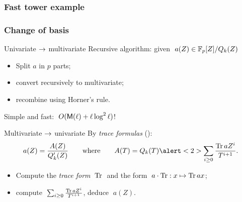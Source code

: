 \documentclass[10pt,usepdftitle=false]{beamer}
\begin{document}

\begin{frame}
  \frametitle{Fast tower example}
  
\end{frame}


\begin{frame}
  \frametitle{Change of basis}

  \begin{block}{Univariate $\rightarrow$ multivariate}
    Recursive algorithm: given $\;a(Z)\in\mathbb{F}_p[Z]/Q_k(Z)$
    \begin{itemize}
    \item Split $a$ in $p$ parts;
    \item convert recursively to multivariate;
    \item recombine using Horner's rule.
    \end{itemize}
    Simple and fast: \emph{$\;O(\mathsf{M}(\ell) + \ell\log^2\ell)$}!
  \end{block}

  \begin{block}{Multivariate $\rightarrow$ univariate}
    By \textit{trace formulas} (\cite{rouiller99}):
      \[
      a(Z) = \frac{A(Z)}{Q_k'(Z)}
      \qquad\text{where}\qquad
      A(T) = Q_k(T)\alert<2>{\sum_{i\ge 0}\frac{\Tr aZ^i}{T^{i+1}}}
      \text{.}\]
    \begin{itemize}
    \item Compute the \textit{trace form} $\;\operatorname{Tr}\;$ and the form
      $\;a\cdot\operatorname{Tr} : x\mapsto \operatorname{Tr} ax$;
    \item \alert<2>{compute $\;\sum_{i\ge 0}\frac{\operatorname{Tr} aZ^i}{T^{i+1}}$}, deduce $\;a(Z)$.
    \end{itemize}
  \end{block}
\end{frame}

\end{document}
